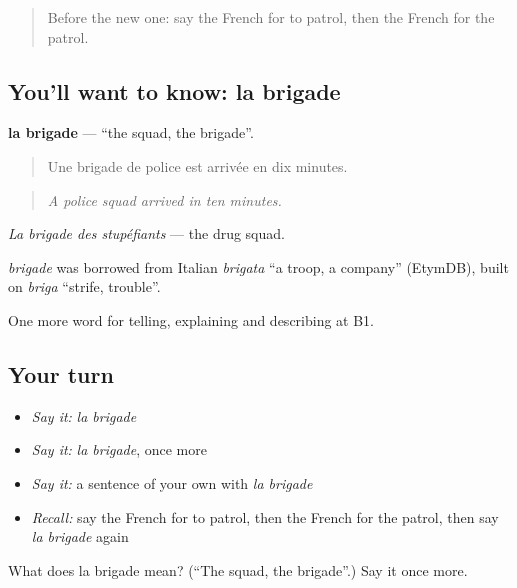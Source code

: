 \label{lesson:FR-C291-brigade}



\begin{quote}
Before the new one: say the French for to patrol, then the French for the patrol.
\end{quote}

\subsection*{You'll want to know: la brigade}
\textbf{la brigade} — \textquotedblleft{}the squad, the brigade\textquotedblright{}.

\begin{quote}
Une brigade de police est arrivée en dix minutes.
\end{quote}

\begin{quote}
\emph{A police squad arrived in ten minutes.}
\end{quote}

\emph{La brigade des stupéfiants} — the drug squad.

\begin{cousinweb}
\emph{brigade} was borrowed from Italian \emph{brigata} \textquotedblleft{}a troop, a company\textquotedblright{} (EtymDB), built on \emph{briga} \textquotedblleft{}strife, trouble\textquotedblright{}.
\end{cousinweb}

\begin{grammarlens}[title={What you've built}]
One more word for telling, explaining and describing at B1.
\end{grammarlens}

\subsection*{Your turn}
\begin{itemize}
\raggedright
  \item \emph{Say it:} \emph{la brigade}
  \item \emph{Say it:} \emph{la brigade}, once more
  \item \emph{Say it:} a sentence of your own with \emph{la brigade}
  \item \emph{Recall:} say the French for to patrol, then the French for the patrol, then say \emph{la brigade} again
\end{itemize}

\begin{tcolorbox}[breakable,colback=teal!4,colframe=teal!35!black,title={Before you move on}]
What does la brigade mean? (\textquotedblleft{}The squad, the brigade\textquotedblright{}.) Say it once more.
\end{tcolorbox}
